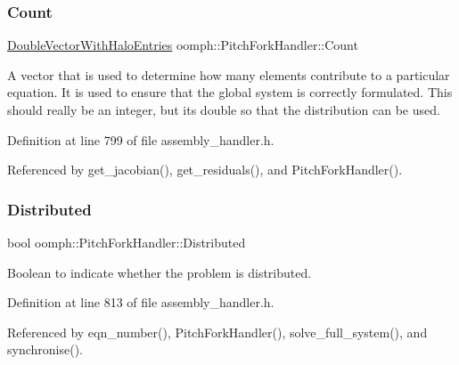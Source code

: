 \subsubsection{\texorpdfstring{Count}{Count}}
{\footnotesize\ttfamily \hyperlink{classoomph_1_1DoubleVectorWithHaloEntries}{Double\+Vector\+With\+Halo\+Entries} oomph\+::\+Pitch\+Fork\+Handler\+::\+Count\hspace{0.3cm}{\ttfamily [private]}}



A vector that is used to determine how many elements contribute to a particular equation. It is used to ensure that the global system is correctly formulated. This should really be an integer, but its double so that the distribution can be used. 



Definition at line 799 of file assembly\+\_\+handler.\+h.



Referenced by get\+\_\+jacobian(), get\+\_\+residuals(), and Pitch\+Fork\+Handler().

\mbox{\label{classoomph_1_1PitchForkHandler_ab948b0ac9640e85e8a17f993a764e000}} 
\subsubsection{\texorpdfstring{Distributed}{Distributed}}
{\footnotesize\ttfamily bool oomph\+::\+Pitch\+Fork\+Handler\+::\+Distributed\hspace{0.3cm}{\ttfamily [private]}}



Boolean to indicate whether the problem is distributed. 



Definition at line 813 of file assembly\+\_\+handler.\+h.



Referenced by eqn\+\_\+number(), Pitch\+Fork\+Handler(), solve\+\_\+full\+\_\+system(), and synchronise().

\mbox{\label{classoomph_1_1PitchForkHandler_a075f47b5f8941d25796f96d258a1752e}} 
